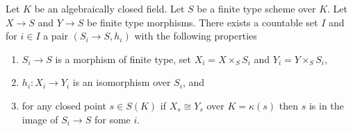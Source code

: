 \begin{lemma}
\label{lemma-countable-isos}
Let $K$ be an algebraically closed field.
Let $S$ be a finite type scheme over $K$.
Let $X \to S$ and $Y \to S$ be finite type morphisms.
There exists a countable set $I$ and for $i \in I$ a pair
$(S_i \to S, h_i)$ with the following properties
\begin{enumerate}
\item $S_i \to S$ is a morphism of finite type, set
$X_i = X \times_S S_i$ and $Y_i = Y \times_S S_i$,
\item $h_i : X_i \to Y_i$ is an isomorphism over $S_i$, and
\item for any closed point $s \in S(K)$ if $X_s \cong Y_s$
over $K = \kappa(s)$ then $s$ is in the image of $S_i \to S$
for some $i$.
\end{enumerate}
\end{lemma}


